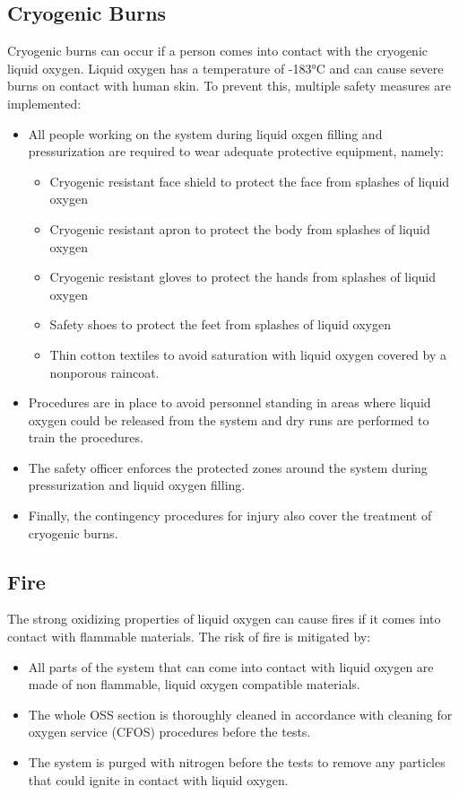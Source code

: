 \documentclass{article}
\begin{document}
\subsection{Cryogenic Burns}
Cryogenic burns can occur if a person comes into contact with the cryogenic liquid oxygen. Liquid oxygen has a temperature of -183°C and can cause severe burns on contact with human skin. To prevent this, multiple safety measures are implemented:
\begin{itemize}
    \item All people working on the system during liquid oxgen filling and pressurization are required to wear adequate protective equipment, namely:
    \begin{itemize}
        \item Cryogenic resistant face shield to protect the face from splashes of liquid oxygen
        \item Cryogenic resistant apron to protect the body from splashes of liquid oxygen
        \item Cryogenic resistant gloves to protect the hands from splashes of liquid oxygen
        \item Safety shoes to protect the feet from splashes of liquid oxygen
        \item Thin cotton textiles to avoid saturation with liquid oxygen covered by a nonporous raincoat.
    \end{itemize}
    \item Procedures are in place to avoid personnel standing in areas where liquid oxygen could be released from the system and dry runs are performed to train the procedures.
    \item The safety officer enforces the protected zones around the system during pressurization and liquid oxygen filling.
    \item Finally, the contingency procedures for injury also cover the treatment of cryogenic burns.
\end{itemize}

\subsection{Fire}
The strong oxidizing properties of liquid oxygen can cause fires if it comes into contact with flammable materials. The risk of fire is mitigated by:
\begin{itemize}
    \item All parts of the system that can come into contact with liquid oxygen are made of non flammable, liquid oxygen compatible materials.
    \item The whole OSS section is thoroughly cleaned in accordance with cleaning for oxygen service (CFOS) procedures before the tests.
    \item The system is purged with nitrogen before the tests to remove any particles that could ignite in contact with liquid oxygen.
\end{itemize}
\end{document}
